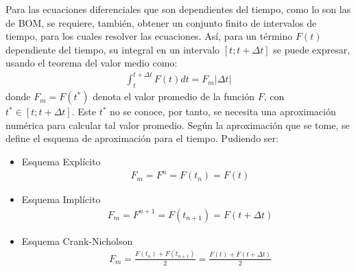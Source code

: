 Para las ecuaciones diferenciales que son dependientes del tiempo, como lo son las de BOM, se requiere, también, obtener un conjunto finito de intervalos de tiempo, para los cuales resolver las ecuaciones. Así, para un término $F(t)$ dependiente del tiempo, su integral en un intervalo $\left[t;t+\Delta t\right]$ se puede expresar, usando el teorema del valor medio como:
\begin{align}
	\int_{t}^{t+\Delta t} F(t) dt = F_{m}|\Delta t|
\end{align}
donde $F_{m} = F(t^{*})$ denota el valor promedio de la función $F$, con $t^{*} \in  \left[t;t+\Delta t\right]$. Este $t^{*}$ no se conoce, por tanto, se necesita una aproximación numérica para calcular tal valor promedio. Según la aproximación que se tome, se define el esquema de aproximación para el tiempo. Pudiendo ser:
\begin{itemize}
	\item Esquema Explícito
	\begin{align}
		\label{ec:Explicit}&F_{m} = F^{n} = F(t_{n}) = F(t)
	\end{align}
	\item Esquema Implícito
	\begin{align}
	\label{ec:Implicit}&F_{m} = F^{n+1} = F(t_{n+1}) = F(t+\Delta t)
	\end{align}
	\item Esquema Crank-Nicholson
	\begin{align}
	\label{ec:C-N}&F_{m} = \frac{F(t_{n})+F(t_{n+1})}{2} = \frac{F(t)+F(t + \Delta t)}{2}
	\end{align}
\end{itemize}


